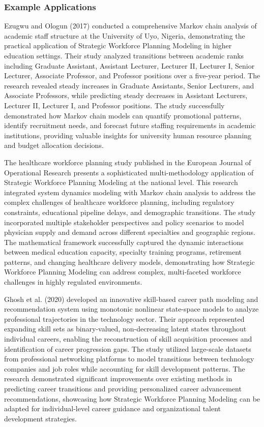 \documentclass[main.tex]{subfiles}
\begin{document}
\subsubsection{Example Applications}

Ezugwu and Ologun (2017) conducted a comprehensive Markov chain analysis of academic staff structure at the University of Uyo, Nigeria, demonstrating the practical application of Strategic Workforce Planning Modeling in higher education settings\parencite{ezugwu2017}. Their study analyzed transitions between academic ranks including Graduate Assistant, Assistant Lecturer, Lecturer II, Lecturer I, Senior Lecturer, Associate Professor, and Professor positions over a five-year period. The research revealed steady increases in Graduate Assistants, Senior Lecturers, and Associate Professors, while predicting steady decreases in Assistant Lecturers, Lecturer II, Lecturer I, and Professor positions. The study successfully demonstrated how Markov chain models can quantify promotional patterns, identify recruitment needs, and forecast future staffing requirements in academic institutions, providing valuable insights for university human resource planning and budget allocation decisions.

The healthcare workforce planning study published in the European Journal of Operational Research presents a sophisticated multi-methodology application of Strategic Workforce Planning Modeling at the national level\parencite{healthcare2018}. This research integrated system dynamics modeling with Markov chain analysis to address the complex challenges of healthcare workforce planning, including regulatory constraints, educational pipeline delays, and demographic transitions. The study incorporated multiple stakeholder perspectives and policy scenarios to model physician supply and demand across different specialties and geographic regions. The mathematical framework successfully captured the dynamic interactions between medical education capacity, specialty training programs, retirement patterns, and changing healthcare delivery models, demonstrating how Strategic Workforce Planning Modeling can address complex, multi-faceted workforce challenges in highly regulated environments.

Ghosh et al. (2020) developed an innovative skill-based career path modeling and recommendation system using monotonic nonlinear state-space models to analyze professional trajectories in the technology sector\parencite{ghosh2020}. Their approach represented expanding skill sets as binary-valued, non-decreasing latent states throughout individual careers, enabling the reconstruction of skill acquisition processes and identification of career progression gaps. The study utilized large-scale datasets from professional networking platforms to model transitions between technology companies and job roles while accounting for skill development patterns. The research demonstrated significant improvements over existing methods in predicting career transitions and providing personalized career advancement recommendations, showcasing how Strategic Workforce Planning Modeling can be adapted for individual-level career guidance and organizational talent development strategies.
\end{document}
